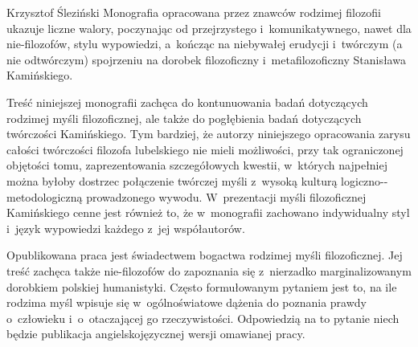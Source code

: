 \begin{recplenv}{Krzysztof Śleziński}
Monografia opracowana przez znawców rodzimej filozofii ukazuje liczne walory, poczynając od przejrzystego i~komunikatywnego,
nawet dla nie-filozofów, stylu wypowiedzi, a~kończąc na niebywałej erudycji i~twórczym (a nie
odtwórczym) spojrzeniu na dorobek filozoficzny i~metafilozoficzny Stanisława Kamińskiego.

Treść niniejszej monografii zachęca do kontunuowania badań dotyczących rodzimej myśli filozoficznej, ale także do
pogłębienia badań dotyczących twórczości Kamińskiego. Tym bardziej, że autorzy niniejszego opracowania zarysu całości
twórczości filozofa lubelskiego nie mieli możliwości, przy tak ograniczonej objętości tomu, zaprezentowania
szczegółowych kwestii, w~których najpełniej można byłoby dostrzec połączenie twórczej myśli z~wysoką kulturą
logiczno-\linebreak[4]
\mbox{-metodologiczną} %
prowadzonego wywodu. W~prezentacji myśli filozoficznej Kamińskiego cenne jest również to,
że w~monografii zachowano indywidualny styl i~język wypowiedzi każdego z~jej współautorów. 

Opublikowana praca jest świadectwem bogactwa rodzimej myśli filozoficznej. Jej treść zachęca także nie-filozofów do
zapoznania się z~nierzadko marginalizowanym dorobkiem polskiej humanistyki. Często formułowanym pytaniem jest to, na ile
rodzima myśl wpisuje się w~ogólnoświatowe dążenia do poznania prawdy o~człowieku i~o~otaczającej go rzeczywistości.
Odpowiedzią na to pytanie niech będzie publikacja angielskojęzycznej wersji omawianej pracy.


\end{recplenv}
